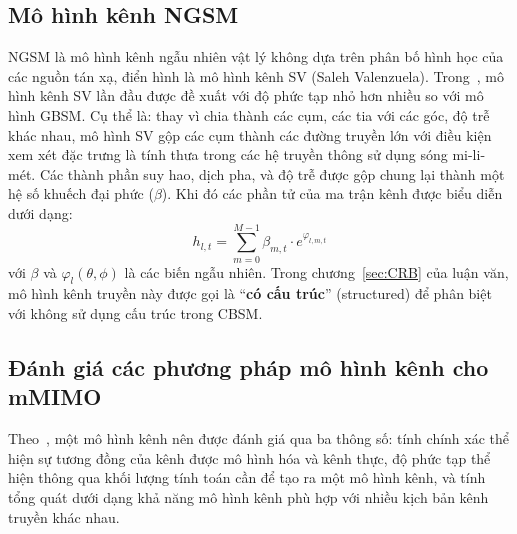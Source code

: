 \subsection{Mô hình kênh NGSM}
\label{sec:NGSM}
NGSM là mô hình kênh ngẫu nhiên vật lý không dựa trên phân bố hình học của các nguồn tán xạ, điển hình là mô hình kênh SV (Saleh Valenzuela).
Trong~\cite{Saleh1987}, mô hình kênh SV lần đầu được đề xuất với độ phức tạp nhỏ hơn nhiều so với mô hình GBSM. 
Cụ thể là: thay vì chia thành các cụm, các tia với các góc, độ trễ khác nhau, mô hình SV gộp các cụm thành các đường truyền lớn với điều kiện xem xét đặc trưng là tính thưa trong các hệ truyền thông sử dụng sóng mi-li-mét. Các thành phần suy hao, dịch pha, và độ trễ được gộp chung lại thành một hệ số khuếch đại phức ($\beta$). Khi đó các phần tử của ma trận kênh được biểu diễn dưới dạng:
\begin{equation}
    h_{l, t} = \sum\limits_{m=0}^{M-1} \beta_{m, t} \cdot e^{\varphi_{l, m, t}} 
\end{equation}
với $\beta$ và $\varphi_l(\theta, \phi)$  là các biến ngẫu nhiên.
Trong chương~\ref{sec:CRB} của luận văn, mô hình kênh truyền này được gọi là ``\textbf{có cấu trúc}'' (structured) để phân biệt với không sử dụng cấu trúc trong CBSM.


\subsection{Đánh giá các phương pháp mô hình kênh cho mMIMO}

Theo~\cite{Feng2022}, một mô hình kênh nên được đánh giá qua ba thông số: tính chính xác thể hiện sự tương đồng của kênh được mô hình hóa và kênh thực, độ phức tạp thể hiện thông qua khối lượng tính toán cần để tạo ra một mô hình kênh, và tính tổng quát dưới dạng khả năng mô hình kênh phù hợp với nhiều kịch bản kênh truyền khác nhau.

